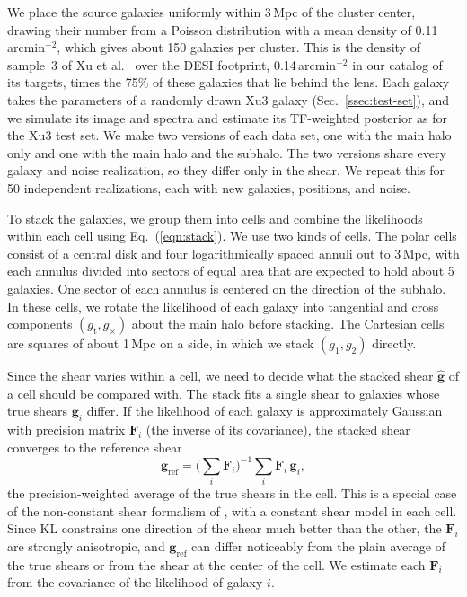 We place the source galaxies uniformly within 3\,Mpc of the cluster center, drawing their number from a Poisson distribution with a mean density of 0.11\,arcmin$^{-2}$, which gives about 150 galaxies per cluster. This is the density of sample~3 of Xu et al.~\citep{KLDESI} over the DESI footprint, 0.14\,arcmin$^{-2}$ in our catalog of its targets, times the 75\% of these galaxies that lie behind the lens. Each galaxy takes the parameters of a randomly drawn Xu3 galaxy (Sec.~\ref{ssec:test-set}), and we simulate its image and spectra and estimate its TF-weighted posterior as for the Xu3 test set. We make two versions of each data set, one with the main halo only and one with the main halo and the subhalo. The two versions share every galaxy and noise realization, so they differ only in the shear. We repeat this for 50 independent realizations, each with new galaxies, positions, and noise.

To stack the galaxies, we group them into cells and combine the likelihoods within each cell using Eq.~(\ref{eqn:stack}). We use two kinds of cells. The polar cells consist of a central disk and four logarithmically spaced annuli out to 3\,Mpc, with each annulus divided into sectors of equal area that are expected to hold about 5 galaxies. One sector of each annulus is centered on the direction of the subhalo. In these cells, we rotate the likelihood of each galaxy into tangential and cross components $(g_\mathrm{t}, g_\times)$ about the main halo before stacking. The Cartesian cells are squares of about 1\,Mpc on a side, in which we stack $(g_1, g_2)$ directly.

Since the shear varies within a cell, we need to decide what the stacked shear $\hat{\mathbf{g}}$ of a cell should be compared with. The stack fits a single shear to galaxies whose true shears $\mathbf{g}_i$ differ. If the likelihood of each galaxy is approximately Gaussian with precision matrix $\mathbf{F}_i$ (the inverse of its covariance), the stacked shear converges to the reference shear
\begin{equation}
\label{eqn:gref}
    \mathbf{g}_\mathrm{ref} = \Big(\sum_{i} \mathbf{F}_i\Big)^{-1} \sum_{i} \mathbf{F}_i\, \mathbf{g}_i,
\end{equation}
the precision-weighted average of the true shears in the cell. This is a special case of the non-constant shear formalism of \citep{BA14}, with a constant shear model in each cell. Since KL constrains one direction of the shear much better than the other, the $\mathbf{F}_i$ are strongly anisotropic, and $\mathbf{g}_\mathrm{ref}$ can differ noticeably from the plain average of the true shears or from the shear at the center of the cell. We estimate each $\mathbf{F}_i$ from the covariance of the likelihood of galaxy $i$.

